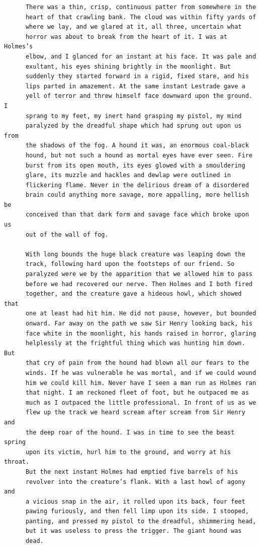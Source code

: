 \documentclass{article}
\begin{document}
\begin{verbatim}
      There was a thin, crisp, continuous patter from somewhere in the
      heart of that crawling bank. The cloud was within fifty yards of
      where we lay, and we glared at it, all three, uncertain what
      horror was about to break from the heart of it. I was at Holmes’s
      elbow, and I glanced for an instant at his face. It was pale and
      exultant, his eyes shining brightly in the moonlight. But
      suddenly they started forward in a rigid, fixed stare, and his
      lips parted in amazement. At the same instant Lestrade gave a
      yell of terror and threw himself face downward upon the ground. I
      sprang to my feet, my inert hand grasping my pistol, my mind
      paralyzed by the dreadful shape which had sprung out upon us from
      the shadows of the fog. A hound it was, an enormous coal-black
      hound, but not such a hound as mortal eyes have ever seen. Fire
      burst from its open mouth, its eyes glowed with a smouldering
      glare, its muzzle and hackles and dewlap were outlined in
      flickering flame. Never in the delirious dream of a disordered
      brain could anything more savage, more appalling, more hellish be
      conceived than that dark form and savage face which broke upon us
      out of the wall of fog.

      With long bounds the huge black creature was leaping down the
      track, following hard upon the footsteps of our friend. So
      paralyzed were we by the apparition that we allowed him to pass
      before we had recovered our nerve. Then Holmes and I both fired
      together, and the creature gave a hideous howl, which showed that
      one at least had hit him. He did not pause, however, but bounded
      onward. Far away on the path we saw Sir Henry looking back, his
      face white in the moonlight, his hands raised in horror, glaring
      helplessly at the frightful thing which was hunting him down. But
      that cry of pain from the hound had blown all our fears to the
      winds. If he was vulnerable he was mortal, and if we could wound
      him we could kill him. Never have I seen a man run as Holmes ran
      that night. I am reckoned fleet of foot, but he outpaced me as
      much as I outpaced the little professional. In front of us as we
      flew up the track we heard scream after scream from Sir Henry and
      the deep roar of the hound. I was in time to see the beast spring
      upon its victim, hurl him to the ground, and worry at his throat.
      But the next instant Holmes had emptied five barrels of his
      revolver into the creature’s flank. With a last howl of agony and
      a vicious snap in the air, it rolled upon its back, four feet
      pawing furiously, and then fell limp upon its side. I stooped,
      panting, and pressed my pistol to the dreadful, shimmering head,
      but it was useless to press the trigger. The giant hound was
      dead.


\end{verbatim}
\end{document}
